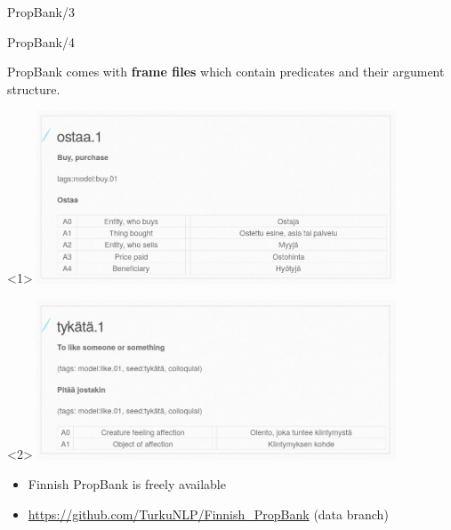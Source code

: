 \documentclass[10pt, compress]{beamer}
\begin{document}
\begin{frame}{PropBank/3}

\end{frame}

\begin{frame}{PropBank/4}

PropBank comes with \textbf{frame files} which contain predicates and their argument structure.

\begin{center}
\begin{onlyenv}<1>
\includegraphics[width=0.8\textwidth]{graphics/finn-propbank.png}
\end{onlyenv}
\begin{onlyenv}<2>
\includegraphics[width=0.8\textwidth]{graphics/finn-propbank2.png}
\end{onlyenv}
\end{center}

\begin{itemize}
  \item Finnish PropBank is freely available
  \item \url{https://github.com/TurkuNLP/Finnish_PropBank} (data branch)
\end{itemize}
  
\end{frame}
\end{document}
